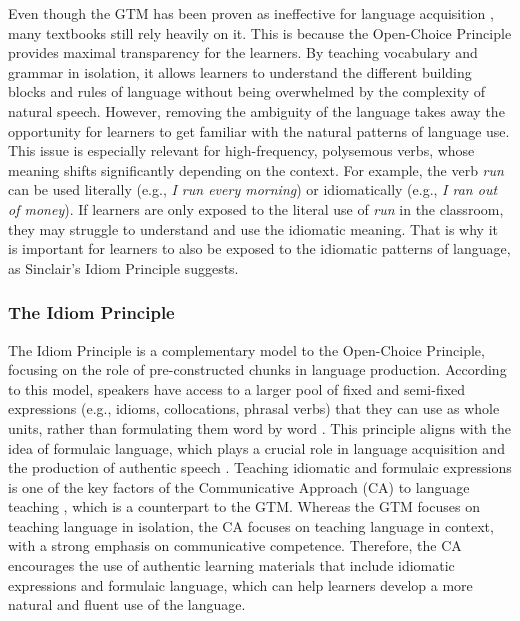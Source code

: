 \documentclass[11pt,a4paper]{article}
\begin{document}
Even though the GTM has been proven as ineffective for language acquisition \parencite{richards2006communicative}, many textbooks still rely heavily on it. This is because the Open-Choice Principle provides maximal transparency for the learners. By teaching vocabulary and grammar in isolation, it allows learners to understand the different building blocks and rules of language without being overwhelmed by the complexity of natural speech. However, removing the ambiguity of the language takes away the opportunity for learners to get familiar with the natural patterns of language use. This issue is especially relevant for high-frequency, polysemous verbs, whose meaning shifts significantly depending on the context. For example, the verb \textit{run} can be used literally (e.g., \textit{I run every morning}) or idiomatically (e.g., \textit{I ran out of money}). If learners are only exposed to the literal use of \textit{run} in the classroom, they may struggle to understand and use the idiomatic meaning. That is why it is important for learners to also be exposed to the idiomatic patterns of language, as Sinclair's Idiom Principle suggests.

\subsubsection{The Idiom Principle}\label{subsubsec:idiom-principle}

The Idiom Principle is a complementary model to the Open-Choice Principle, focusing on the role of pre-constructed chunks in language production. According to this model, speakers have access to a larger pool of fixed and semi-fixed expressions (e.g., idioms, collocations, phrasal verbs) that they can use as whole units, rather than formulating them word by word \parencite[110]{sinclairCorpusConcordanceCollocation1991}. This principle aligns with the idea of formulaic language, which plays a crucial role in language acquisition and the production of authentic speech \parencite[91--92]{schmaleFormulaicExpressionsForeign2022}. Teaching idiomatic and formulaic expressions is one of the key factors of the Communicative Approach (CA) to language teaching \parencite{savignon1987communicative}, which is a counterpart to the GTM. Whereas the GTM focuses on teaching language in isolation, the CA focuses on teaching language in context, with a strong emphasis on communicative competence. Therefore, the CA encourages the use of authentic learning materials that include idiomatic expressions and formulaic language, which can help learners develop a more natural and fluent use of the language.
\end{document}
